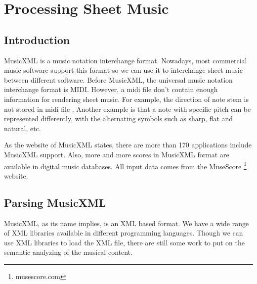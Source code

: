 \chapter{Processing Sheet Music}

\label{Chapter:Processing-Sheet-Music}

\newcommand{\element}[1]{{\textit #1}}

\section{Introduction}
MusicXML\citep{good2001musicxml} is a music notation interchange format. Nowadays, most commercial music software support this format so we can use it to interchange sheet music between different software. Before MusicXML, the universal music notation interchange format is MIDI. However, a midi file don't contain enough information for rendering sheet music. For example, the direction of note stem is not stored in midi file . Another example is that a note with specific pitch can be represented differently, with the alternating symbols such as sharp, flat and natural, etc.

As the website of MusicXML states, there are more than 170 applications include MusicXML support. Also, more and more scores in MusicXML format are available in digital music databases. All input data comes from the MuseScore \footnote{musescore.com} website. 

\section{Parsing MusicXML}
MusicXML, as its name implies, is an XML based format. We have a wide range of XML libraries available in different programming languages.
Though we can use XML libraries to load the XML file, there are still some work to put on the semantic analyzing of the musical content. 
